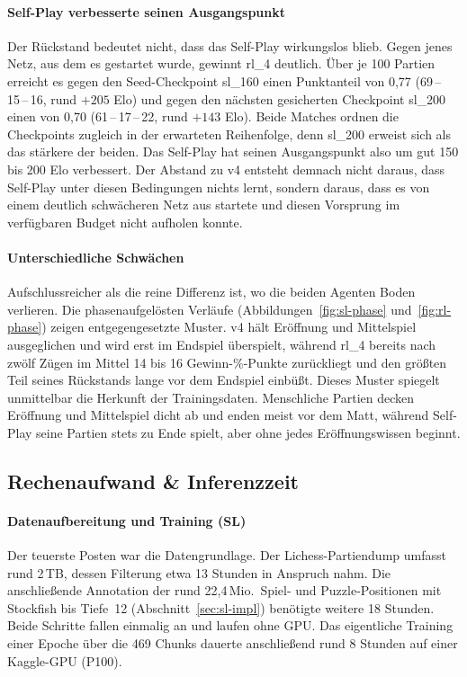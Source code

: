 \documentclass[
  a4paper, 12pt,
  parskip=half,
  headings=small,
  bibliography=totoc
]{scrartcl}
\begin{document}
\paragraph{Self-Play verbesserte seinen Ausgangspunkt}
Der Rückstand bedeutet nicht, dass das Self-Play wirkungslos blieb. Gegen jenes Netz,
aus dem es gestartet wurde, gewinnt rl\_4 deutlich. Über je 100 Partien erreicht es
gegen den Seed-Checkpoint sl\_160 einen Punktanteil von 0{,}77
(69\,--\,15\,--\,16, rund \(+205\) Elo) und gegen den nächsten gesicherten
Checkpoint sl\_200 einen von 0{,}70 (61\,--\,17\,--\,22, rund \(+143\) Elo). Beide
Matches ordnen die Checkpoints zugleich in der erwarteten Reihenfolge, denn sl\_200
erweist sich als das stärkere der beiden. Das Self-Play hat seinen Ausgangspunkt also
um gut 150 bis 200 Elo verbessert. Der Abstand zu v4 entsteht demnach nicht daraus,
dass Self-Play unter diesen Bedingungen nichts lernt, sondern daraus, dass es von
einem deutlich schwächeren Netz aus startete und diesen Vorsprung im verfügbaren
Budget nicht aufholen konnte.

\paragraph{Unterschiedliche Schwächen}
Aufschlussreicher als die reine Differenz ist, wo die beiden Agenten Boden verlieren.
Die phasenaufgelösten Verläufe (Abbildungen~\ref{fig:sl-phase} und~\ref{fig:rl-phase})
zeigen entgegengesetzte Muster. v4 hält Eröffnung und Mittelspiel ausgeglichen und
wird erst im Endspiel überspielt, während rl\_4 bereits nach zwölf Zügen im Mittel
14 bis 16 Gewinn-\%-Punkte zurückliegt und den größten Teil seines Rückstands lange
vor dem Endspiel einbüßt. Dieses Muster spiegelt unmittelbar die Herkunft der
Trainingsdaten. Menschliche Partien decken Eröffnung und Mittelspiel dicht ab und
enden meist vor dem Matt, während Self-Play seine Partien stets zu Ende spielt, aber
ohne jedes Eröffnungswissen beginnt.

\subsection{Rechenaufwand \& Inferenzzeit}\label{sec:compute}

\paragraph{Datenaufbereitung und Training (SL)}
Der teuerste Posten war die Datengrundlage. Der Lichess-Partiendump umfasst rund
2\,TB, dessen Filterung etwa 13 Stunden in Anspruch nahm. Die anschließende
Annotation der rund 22{,}4\,Mio.\ Spiel- und Puzzle-Positionen mit Stockfish bis
Tiefe~12 (Abschnitt~\ref{sec:sl-impl}) benötigte weitere 18 Stunden. Beide Schritte
fallen einmalig an und laufen ohne GPU. Das eigentliche Training einer Epoche über
die 469 Chunks dauerte anschließend rund 8 Stunden auf einer Kaggle-GPU (P100).
\end{document}
